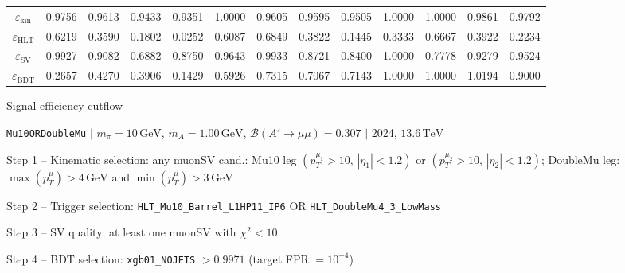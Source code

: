 \documentclass[10pt,a4paper]{article}
\begin{document}
\begin{landscape}
{\begin{tabular}{c|cccc|cccc|cccc}
\midrule
$\varepsilon_{\mathrm{kin}}$ & 0.9756 & 0.9613 & 0.9433 & 0.9351 & 1.0000 & 0.9605 & 0.9595 & 0.9505 & 1.0000 & 1.0000 & 0.9861 & 0.9792\\
$\varepsilon_{\mathrm{HLT}}$ & 0.6219 & 0.3590 & 0.1802 & 0.0252 & 0.6087 & 0.6849 & 0.3822 & 0.1445 & 0.3333 & 0.6667 & 0.3922 & 0.2234\\
$\varepsilon_{\mathrm{SV}}$ & 0.9927 & 0.9082 & 0.6882 & 0.8750 & 0.9643 & 0.9933 & 0.8721 & 0.8400 & 1.0000 & 0.7778 & 0.9279 & 0.9524\\
$\varepsilon_{\mathrm{BDT}}$ & 0.2657 & 0.4270 & 0.3906 & 0.1429 & 0.5926 & 0.7315 & 0.7067 & 0.7143 & 1.0000 & 1.0000 & 1.0194 & 0.9000\\
\bottomrule
\end{tabular}}

\end{landscape}
\clearpage

{\large Signal efficiency cutflow

 \texttt{Mu10ORDoubleMu} $|$ $m_{\pi}=10\,\mathrm{GeV}$, $m_{A}=1.00\,\mathrm{GeV}$, $\mathcal{B}(A'\!\to\!\mu\mu)=0.307$ $|$ 2024, $13.6\,\mathrm{TeV}$}

\vspace{0.8em}

Step 1 -- Kinematic selection: any muonSV cand.: Mu10 leg $(p_T^{\mu_1}{>}10,\,|\eta_1|{<}1.2)$ or $(p_T^{\mu_2}{>}10,\,|\eta_2|{<}1.2)$; DoubleMu leg: $\max(p_T^{\mu}){>}4\,\mathrm{GeV}$ and $\min(p_T^{\mu}){>}3\,\mathrm{GeV}$

Step 2 -- Trigger selection: \texttt{HLT\_Mu10\_Barrel\_L1HP11\_IP6} OR \texttt{HLT\_DoubleMu4\_3\_LowMass}

Step 3 -- SV quality: at least one muonSV with $\chi^2<10$

Step 4 -- BDT selection: \texttt{xgb01\_NOJETS} $>0.9971$ (target FPR $=10^{-4}$)

\vspace{0.8em}
\end{document}
